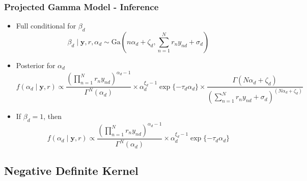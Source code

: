 \documentclass[aspectratio=169,10pt]{beamer}
\begin{document}
\begin{frame}
  \frametitle{Projected Gamma Model - Inference}
  \label{pgpareto:pginference}
  \begin{itemize}
    \item Full conditional for $\beta_d$
      \begin{equation*}
        \beta_d\mid \bm{ y}, r, \alpha_d \sim \text{Ga}\left(n\alpha_d + \zeta_d,
                {\textstyle \sum}_{n = 1}^Nr_ny_{nd} + \sigma_d\right)
      \end{equation*}
    \item Posterior for $\alpha_d$
      \begin{equation*}
        f(\alpha_d \mid \bm{ y}, r) \propto
          \frac{\left({\textstyle \prod}_{n = 1}^Nr_ny_{nd}\right)^{\alpha_d - 1}}{
            \Gamma^N(\alpha_d)} \times \alpha_d^{\xi_d - 1}\exp\{-\tau_d\alpha_d\} \times
            \frac{\Gamma(N\alpha_d + \zeta_d)}{
            \left({\textstyle\sum}_{n = 1}^N r_ny_{nd} + \sigma_d
                  \right)^{(N\alpha_d + \zeta_d)}}
      \end{equation*}
    \item If $\beta_d = 1$, then
    \begin{equation*}
      f(\alpha_d \mid \bm{ y}, r) \propto
        \frac{\left({\textstyle\prod}_{n = 1}^N r_ny_{nd}\right)^{\alpha_d - 1}}{\Gamma^N(\alpha_d)} \times
        \alpha_d^{\xi_d - 1}\exp\{-\tau_d\alpha_d\}
    \end{equation*}
  \end{itemize}
  \hyperlink{pgpareto:angulardatamodel}{}
\end{frame}

\subsection*{Negative Definite Kernel}
\end{document}
